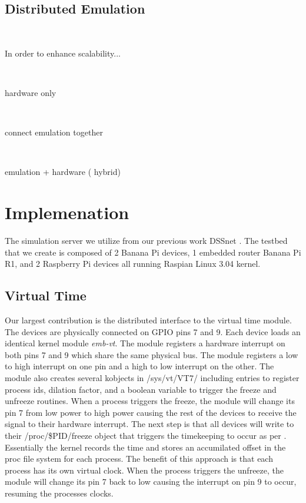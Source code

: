 \subsection{Distributed Emulation}
\

In order to enhance scalability...

\

hardware only

\

connect emulation together

\

emulation + hardware ( hybrid)


\section{Implemenation}

The simulation server we utilize from our previous work DSSnet \cite{Hannon:2016}.
The testbed that we create is composed of 2 Banana Pi devices, 1 embedded router Banana Pi R1, and 2 Raspberry Pi devices all running Raspian Linux 3.04 kernel.

\subsection{Virtual Time}
Our largest contribution is the distributed interface to the virtual time module. The devices are physically connected on GPIO pins 7 and 9. Each device loads an identical kernel module \textit{emb-vt}. The module registers a hardware interrupt on both pins 7 and 9 which share the same physical bus. The module registers a low to high interrupt on one pin and a high to low interrupt on the other. The module also creates several kobjects in /sys/vt/VT7/ including entries to register process ids, dilation factor, and a boolean variable to trigger the freeze and unfreeze routines.
When a process triggers the freeze, the module will change its pin 7 from low power to high power causing the rest of the devices to receive the signal to their hardware interrupt. The next step is that all devices will write to their /proc/\$PID/freeze object that triggers the timekeeping to occur as per \cite{Yan:VTS:pads15}.
Essentially the kernel records the time and stores an accumilated offset in the proc file system for each process. The benefit of this approach is that each process has its own virtual clock.
When the process triggers the unfreeze, the module will change its pin 7 back to low causing the interrupt on pin 9 to occur, resuming the processes clocks.

